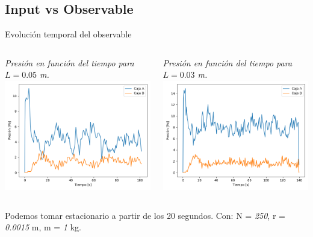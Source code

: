\documentclass{beamer}
\begin{document}
\subsection{Input vs Observable}
\begin{frame}{Evolución temporal del observable}
  \begin{columns}
    \begin{column}{0.5\textwidth}
      \scriptsize \textit{Presión en función del tiempo para $L = \textit{0.05}$ m.}
      \includegraphics[width=\linewidth]{photoMaterial/pvt_05.png}
    \end{column}
    \begin{column}{0.5\textwidth}
      \scriptsize \textit{Presión en función del tiempo para $L = \textit{0.03}$ m.}
      \includegraphics[width=\linewidth]{photoMaterial/pvt_03.png}
    \end{column}
  \end{columns}
  \tiny Podemos tomar estacionario a partir de los 20 segundos.
  \tiny Con: N = \textit{250}, r = \textit{0.0015} m, m = \textit{1} kg.
\end{frame}
\end{document}
